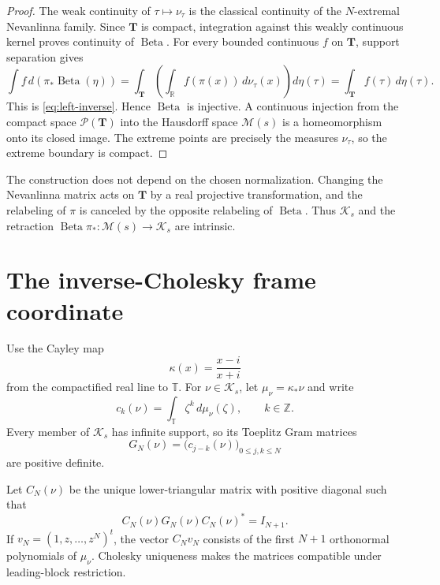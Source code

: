 \documentclass[11pt]{article}
\newcommand{\R}{\mathbb R}
\newcommand{\T}{\mathbb T}
\newcommand{\cK}{\mathcal K}
\newcommand{\cM}{\mathcal M}
\newcommand{\cP}{\mathcal P}
\newcommand{\Beta}{\operatorname{Beta}}
\begin{document}
\begin{proof}
The weak continuity of $\tau\mapsto\nu_\tau$ is the classical continuity of the
$N$-extremal Nevanlinna family.  Since $\mathbf T$ is compact, integration against this weakly
continuous kernel proves continuity of $\Beta$.  For every bounded continuous $f$ on
$\mathbf T$, support separation gives
\[
 \int f\,d(\pi_*\Beta(\eta))
 =\int_{\mathbf T}\left(\int_{\R}f(\pi(x))\,d\nu_\tau(x)\right)d\eta(\tau)
 =\int_{\mathbf T}f(\tau)\,d\eta(\tau).
\]
This is \eqref{eq:left-inverse}.  Hence $\Beta$ is injective.  A continuous injection from the
compact space $\cP(\mathbf T)$ into the Hausdorff space $\cM(s)$ is a homeomorphism onto its
closed image.  The extreme points are precisely the measures $\nu_\tau$, so the extreme boundary
is compact.
\end{proof}

The construction does not depend on the chosen normalization.  Changing the Nevanlinna matrix
acts on $\mathbf T$ by a real projective transformation, and the relabeling of $\pi$ is canceled by
the opposite relabeling of $\Beta$.  Thus $\cK_s$ and the retraction
$\Beta\pi_*:\cM(s)\to\cK_s$ are intrinsic.

\section{The inverse-Cholesky frame coordinate}\label{sec:frame}

Use the Cayley map
\begin{equation}\label{eq:cayley}
  \kappa(x)=\frac{x-i}{x+i}
\end{equation}
from the compactified real line to $\T$.  For $\nu\in\cK_s$, let
$\mu_\nu=\kappa_*\nu$ and write
\begin{equation}\label{eq:circle-moments}
  c_k(\nu)=\int_{\T}\zeta^k\,d\mu_\nu(\zeta),\qquad k\in\mathbb Z.
\end{equation}
Every member of $\cK_s$ has infinite support, so its Toeplitz Gram matrices
\begin{equation}\label{eq:gram}
  G_N(\nu)=\bigl(c_{j-k}(\nu)\bigr)_{0\leq j,k\leq N}
\end{equation}
are positive definite.

Let $C_N(\nu)$ be the unique lower-triangular matrix with positive diagonal such that
\begin{equation}\label{eq:cholesky}
  C_N(\nu)G_N(\nu)C_N(\nu)^*=I_{N+1}.
\end{equation}
If $v_N=(1,z,\ldots,z^N)^t$, the vector $C_Nv_N$ consists of the first $N+1$
orthonormal polynomials of $\mu_\nu$.  Cholesky uniqueness makes the matrices compatible under
leading-block restriction.
\end{document}
